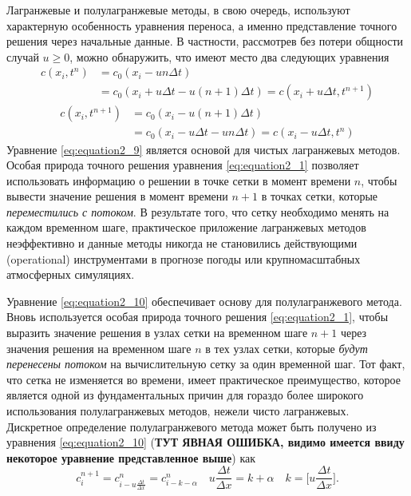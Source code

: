 Лагранжевые и полулагранжевые методы, в свою очередь, используют характерную особенность уравнения переноса, а именно представление точного решения через начальные данные. В частности, рассмотрев без потери общности случай $u\ge0$, можно обнаружить, что имеют место два следующих уравнения
%
\begin{equation}
\label{eq:equation2_8}
\begin{split}
c (x_i, t^n) & = c_0(x_i - un\Delta t) {} \\
		     & {} = c_0(x_i + u\Delta t - u(n+1)\Delta t) = c(x_i + u\Delta t, t^{n+1})
\end{split}
\end{equation}
%
%
\begin{equation}
\label{eq:equation2_9}
\begin{split}
c (x_i, t^{n+1}) & = c_0(x_i - u(n+1)\Delta t) {} \\
& {} = c_0(x_i - u\Delta t - un\Delta t) = c(x_i - u\Delta t, t^{n})
\end{split}
\end{equation}
%
Уравнение \eqref{eq:equation2_9} является основой для чистых лагранжевых методов. Особая природа точного решения уравнения \eqref{eq:equation2_1} позволяет использовать информацию о решении в точке сетки в момент времени $n$, чтобы вывести значение решения в момент времени $n+1$ в точках сетки, которые \textit{переместились с потоком}. В результате того, что сетку необходимо менять на каждом временном шаге, практическое приложение лагранжевых методов неэффективно и данные методы никогда не становились действующими (operational) инструментами в прогнозе погоды или крупномасштабных атмосферных симуляциях.

Уравнение \eqref{eq:equation2_10} обеспечивает основу для полулагранжевого метода. Вновь используется особая природа точного решения \eqref{eq:equation2_1}, чтобы выразить значение решения в узлах сетки на временном шаге $n+1$ через значения решения на временном шаге $n$ в тех узлах сетки, которые \textit{будут перенесены потоком} на вычислительную сетку за один временной шаг.
Тот факт, что сетка не изменяется во времени, имеет практическое преимущество, которое является одной из фундаментальных причин для гораздо более широкого использования полулагранжевых методов, нежели чисто лагранжевых. Дискретное определение полулагранжевого метода может быть получено из уравнения \eqref{eq:equation2_10} (\textbf{ТУТ ЯВНАЯ ОШИБКА, видимо имеется ввиду некоторое уравнение представленное выше}) как
%
\begin{equation}
\label{eq:equation2_10}
c_i^{n+1} = c_{i-u\frac{\Delta t}{\Delta x}}^{n} = c_{i-k-\alpha}^n \quad u\frac{\Delta t}{\Delta x} = k + \alpha \quad k = \Big[u\frac{\Delta t}{\Delta x}\Big].
\end{equation}
%

